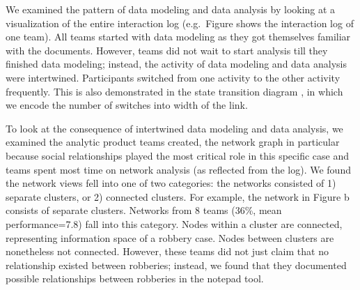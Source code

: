 We examined the pattern of data modeling and data analysis by looking at
a visualization of the entire interaction log (e.g.~Figure
\autocite{fig:sequence} shows the interaction log of one team). All
teams started with data modeling as they got themselves familiar with
the documents. However, teams did not wait to start analysis till they
finished data modeling; instead, the activity of data modeling and data
analysis were intertwined. Participants switched from one activity to
the other activity frequently. This is also demonstrated in the state
transition diagram \autocite{fig:transition}, in which we encode the
number of switches into width of the link.



To look at the consequence of intertwined data modeling and data
analysis, we examined the analytic product teams created, the network
graph in particular because social relationships played the most
critical role in this specific case and teams spent most time on network
analysis (as reflected from the log). We found the network views fell
into one of two categories: the networks consisted of 1) separate
clusters, or 2) connected clusters. For example, the network in Figure
\autocite{fig:network}b consists of separate clusters. Networks from 8
teams (36\%, mean performance=7.8) fall into this category. Nodes within
a cluster are connected, representing information space of a robbery
case. Nodes between clusters are nonetheless not connected. However,
these teams did not just claim that no relationship existed between
robberies; instead, we found that they documented possible relationships
between robberies in the notepad tool.

